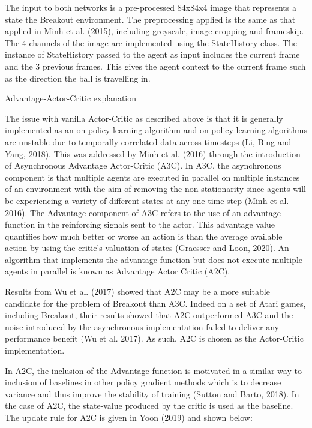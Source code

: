 \documentclass{article}
\begin{document}
The input to both networks is a pre-processed 84x84x4 image that represents a state the Breakout environment. The preprocessing applied is the same as that applied in Minh et al. (2015), including greyscale, image cropping and frameskip. The 4 channels of the image are implemented using the StateHistory class. The instance of StateHistory passed to the agent as input includes the current frame and the 3 previous frames. This gives the agent context to the current frame such as the direction the ball is travelling in.

Advantage-Actor-Critic explanation

The issue with vanilla Actor-Critic as described above is that it is generally implemented as an on-policy learning algorithm and on-policy learning algorithms are unstable due to temporally correlated data across timesteps (Li, Bing and Yang, 2018). This was addressed by Minh et al. (2016) through the introduction of Asynchronous Advantage Actor-Critic (A3C). In A3C, the asynchronous component is that multiple agents are executed in parallel on multiple instances of an environment with the aim of removing the non-stationarity since agents will be experiencing a variety of different states at any one time step (Minh et al. 2016). The Advantage component of A3C refers to the use of an advantage function in the reinforcing signals sent to the actor. This advantage value quantifies how much better or worse an action is than the average available action by using the critic's valuation of states (Graesser and Loon, 2020). An algorithm that implements the advantage function but does not execute multiple agents in parallel is known as Advantage Actor Critic (A2C).

Results from Wu et al. (2017) showed that A2C may be a more suitable candidate for the problem of Breakout than A3C. Indeed on a set of Atari games, including Breakout, their results showed that A2C outperformed A3C and the noise introduced by the asynchronous implementation failed to deliver any performance benefit (Wu et al. 2017). As such, A2C is chosen as the Actor-Critic implementation.

In A2C, the inclusion of the Advantage function is motivated in a similar way to inclusion of baselines in other policy gradient methods which is to decrease variance and thus improve the stability of training (Sutton and Barto, 2018). In the case of A2C, the state-value produced by the critic is used as the baseline. The update rule for A2C is given in Yoon (2019) and shown below:
\end{document}
